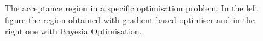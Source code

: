 
\begin{figure}[h]
    \begin{center}
      
      
    \end{center}
  \caption[The acceptance region of a specific deterministic simulator.]{The acceptance region in a specific optimisation problem. In the left figure the region obtained with gradient-based optimiser and in the right one with Bayesia Optimisation.}
  \label{fig:ma2_5}
\end{figure}




